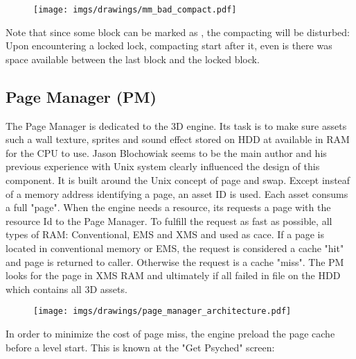 \documentclass[book.tex]{subfiles}
\begin{document}
   \par
\begin{figure}[H]
\centering
 \texttt{[image: imgs/drawings/mm\_bad\_compact.pdf]}
 \end{figure}
 \par
 Note that since some block can be marked as , the compacting will be disturbed: Upon encountering a locked lock, compacting start after it, even is there was space available between the last block and the locked block.












\subsection{Page Manager (PM)}
The Page Manager is dedicated to the 3D engine. Its task is to make sure assets such a wall texture, sprites and sound effect stored on HDD at available in RAM for the CPU to use. Jason Blochowiak seems to be the main author and his previous experience with Unix system clearly influenced the design of this component. It is built around the Unix concept of page and swap. Except insteaf of a memory address identifying a page, an asset ID is used. Each asset consums a full "page". When the engine needs a resource, its requests a page with the resource Id to the Page Manager. To fulfill the request as fast as possible, all types of RAM: Conventional, EMS and XMS and used as cace. If a page is located in conventional memory or EMS, the request is considered a cache "hit" and page is returned to caller. Otherwise the request is a cache "miss". The PM looks for the page in XMS RAM and ultimately if all failed in  file on the HDD which contains all 3D assets.\\
 \par
\begin{figure}[H]
\centering
 \texttt{[image: imgs/drawings/page\_manager\_architecture.pdf]}
 \end{figure}
 \par
In order to minimize the cost of page miss, the engine preload the page cache before a level start. This is known at the "Get Psyched" screen:
 \par
\begin{figure}[H]
\centering
 \end{figure}
\end{document}
